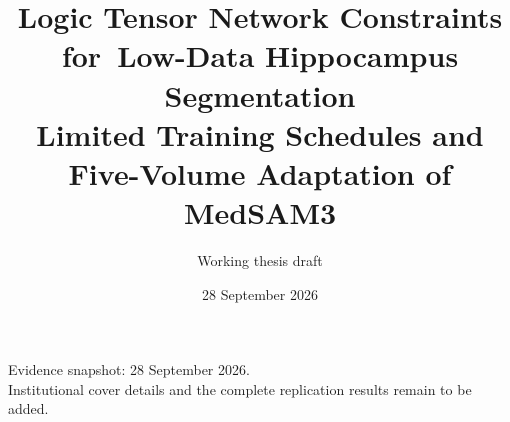 \documentclass[12pt,a4paper]{article}
\title{Logic Tensor Network Constraints for\ Low-Data Hippocampus Segmentation\\[0.6em]
\large Limited Training Schedules and Five-Volume Adaptation of MedSAM3}
\author{Working thesis draft}
\date{28 September 2026}
\begin{document}
\maketitle
\begin{center}\small Evidence snapshot: 28 September 2026.\\
Institutional cover details and the complete replication results remain to be added.\end{center}

\clearpage
\begingroup
{}
\tableofcontents
\endgroup
\clearpage
{}






\appendix

\printbibliography[heading=bibintoc]
% 
\end{document}
